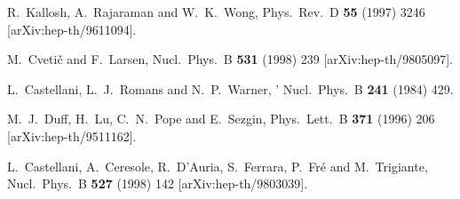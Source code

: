 \documentclass[12pt,a4paper]{article}
\begin{document}
\begin{thebibliography}{40}
R.~Kallosh, A.~Rajaraman and W.~K.~Wong,
Phys.\ Rev.\ D {\bf 55} (1997) 3246
[arXiv:hep-th/9611094].



M.~Cveti\v{c} and F.~Larsen,
Nucl.\ Phys.\ B {\bf 531} (1998) 239
[arXiv:hep-th/9805097].

L.~Castellani, L.~J.~Romans and N.~P.~Warner,
'
Nucl.\ Phys.\ B {\bf 241} (1984) 429.


M.~J.~Duff, H.~Lu, C.~N.~Pope and E.~Sezgin,
Phys.\ Lett.\ B {\bf 371} (1996) 206
[arXiv:hep-th/9511162].

L.~Castellani, A.~Ceresole, R.~D'Auria, S.~Ferrara, P.~Fr\'e 
and M.~Trigiante,
Nucl.\ Phys.\ B {\bf 527} (1998) 142
[arXiv:hep-th/9803039].



\end{thebibliography}


\end{document}
